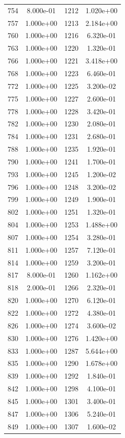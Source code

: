 \documentclass[12pt]{article}
\begin{document}
\begin{longtable}{@{}cccc@{}}
754 & 8.000e-01 & 1212 & 1.020e+00 \\
757 & 1.000e+00 & 1213 & 2.184e+00 \\
760 & 1.000e+00 & 1216 & 6.320e-01 \\
763 & 1.000e+00 & 1220 & 1.320e-01 \\
766 & 1.000e+00 & 1221 & 3.418e+00 \\
768 & 1.000e+00 & 1223 & 6.460e-01 \\
772 & 1.000e+00 & 1225 & 3.200e-02 \\
775 & 1.000e+00 & 1227 & 2.600e-01 \\
778 & 1.000e+00 & 1228 & 3.420e-01 \\
782 & 1.000e+00 & 1230 & 2.080e-01 \\
784 & 1.000e+00 & 1231 & 2.680e-01 \\
788 & 1.000e+00 & 1235 & 1.920e-01 \\
790 & 1.000e+00 & 1241 & 1.700e-01 \\
793 & 1.000e+00 & 1245 & 1.200e-02 \\
796 & 1.000e+00 & 1248 & 3.200e-02 \\
799 & 1.000e+00 & 1249 & 1.900e-01 \\
802 & 1.000e+00 & 1251 & 1.320e-01 \\
804 & 1.000e+00 & 1253 & 1.488e+00 \\
807 & 1.000e+00 & 1254 & 3.280e-01 \\
811 & 1.000e+00 & 1257 & 7.120e-01 \\
814 & 1.000e+00 & 1259 & 3.200e-01 \\
817 & 8.000e-01 & 1260 & 1.162e+00 \\
818 & 2.000e-01 & 1266 & 2.320e-01 \\
820 & 1.000e+00 & 1270 & 6.120e-01 \\
822 & 1.000e+00 & 1272 & 4.380e-01 \\
826 & 1.000e+00 & 1274 & 3.600e-02 \\
830 & 1.000e+00 & 1276 & 1.420e+00 \\
833 & 1.000e+00 & 1287 & 5.644e+00 \\
835 & 1.000e+00 & 1290 & 1.678e+00 \\
839 & 1.000e+00 & 1292 & 1.840e-01 \\
842 & 1.000e+00 & 1298 & 4.100e-01 \\
845 & 1.000e+00 & 1301 & 3.400e-01 \\
847 & 1.000e+00 & 1306 & 5.240e-01 \\
849 & 1.000e+00 & 1307 & 1.600e-02 \\

\end{longtable}
\end{document}
